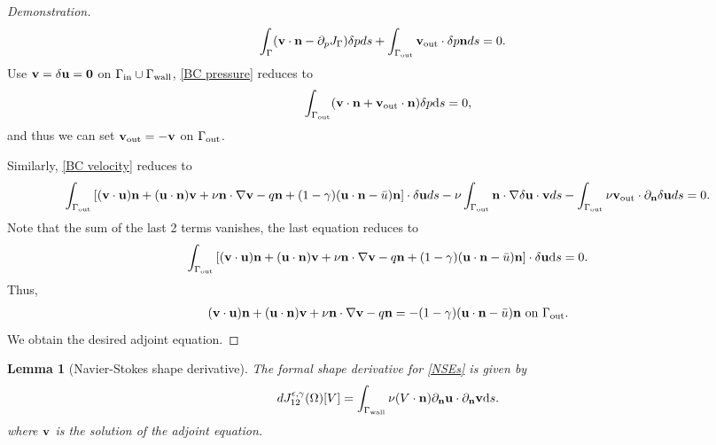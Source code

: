 \documentclass[oneside,11pt]{book}
\numberwithin{equation}{section}
\newtheorem{lemma}{Lemma}[section]
\begin{document}
\begin{proof}[Demonstration]
\begin{align}
        &\int_\Gamma ({\bf v}\cdot{\bf n} - \partial_pJ_\Gamma)\delta pds + \int_{\Gamma_{\rm out}} {\bf v}_{\rm out}\cdot\delta p{\bf n}ds = 0.\label{BC pressure}
    \end{align}
    Use ${\bf v} = \delta{\bf u} = {\bf 0}$ on $\Gamma_{\rm in}\cup\Gamma_{\rm wall}$, \eqref{BC pressure} reduces to
    \begin{align}
        \int_{\Gamma_{\rm out}} ({\bf v}\cdot{\bf n} + {\bf v}_{\rm out}\cdot{\bf n})\delta p{\rm d}s = 0,
    \end{align}
    and thus we can set ${\bf v}_{\rm out} = -{\bf v}$ on $\Gamma_{\rm out}$.
    
    Similarly, \eqref{BC velocity} reduces to
    \begin{align}
        \int_{\Gamma_{\rm out}} \left[({\bf v}\cdot{\bf u}){\bf n} + ({\bf u}\cdot{\bf n}){\bf v} + \nu{\bf n}\cdot\nabla{\bf v} - q{\bf n} + (1 - \gamma)({\bf u}\cdot{\bf n} - \bar{u}){\bf n}\right]\cdot\delta{\bf u}ds - \nu\int_{\Gamma_{\rm out}} {\bf n}\cdot\nabla\delta{\bf u}\cdot{\bf v}ds - \int_{\Gamma_{\rm out}} \nu{\bf v}_{\rm out}\cdot\partial_{\bf n}\delta{\bf u}ds = 0.
    \end{align}
    Note that the sum of the last 2 terms vanishes, the last equation reduces to
    \begin{align}
        \int_{\Gamma_{\rm out}} \left[({\bf v}\cdot{\bf u}){\bf n} + ({\bf u}\cdot{\bf n}){\bf v} + \nu{\bf n}\cdot\nabla{\bf v} - q{\bf n} + (1 - \gamma)({\bf u}\cdot{\bf n} - \bar{u}){\bf n}\right]\cdot\delta{\bf u}{\rm d}s = 0.
    \end{align}
    Thus,
    \begin{align}
        ({\bf v}\cdot{\bf u}){\bf n} + ({\bf u}\cdot{\bf n}){\bf v} + \nu{\bf n}\cdot\nabla{\bf v} - q{\bf n} = -(1 - \gamma)({\bf u}\cdot{\bf n} - \bar{u}){\bf n} \mbox{ on } \Gamma_{\rm out}.
    \end{align}
    We obtain the desired adjoint equation.
\end{proof}

\begin{lemma}[Navier-Stokes shape derivative]
    The formal shape derivative for \eqref{NSEs} is given by
    \begin{align}
        dJ_{12}^{\epsilon,\gamma}(\Omega)[V] = \int_{\Gamma_{\rm wall}} \nu(V\cdot{\bf n})\partial_{\bf n}{\bf u}\cdot\partial_{\bf n}{\bf v}{\rm d}s.
    \end{align}
    where ${\bf v}$ is the solution of the adjoint equation.
\end{lemma}
\end{document}
